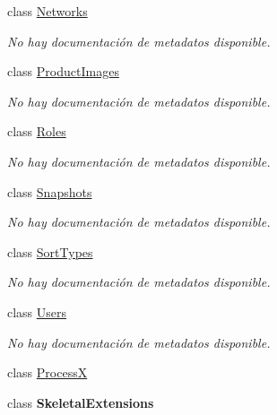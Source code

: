 \begin{DoxyCompactItemize}
class \hyperlink{class_game_memory_1_1_networks}{Networks}
\begin{DoxyCompactList}\small\item\em No hay documentación de metadatos disponible. \end{DoxyCompactList}\item 
class \hyperlink{class_game_memory_1_1_product_images}{Product\-Images}
\begin{DoxyCompactList}\small\item\em No hay documentación de metadatos disponible. \end{DoxyCompactList}\item 
class \hyperlink{class_game_memory_1_1_roles}{Roles}
\begin{DoxyCompactList}\small\item\em No hay documentación de metadatos disponible. \end{DoxyCompactList}\item 
class \hyperlink{class_game_memory_1_1_snapshots}{Snapshots}
\begin{DoxyCompactList}\small\item\em No hay documentación de metadatos disponible. \end{DoxyCompactList}\item 
class \hyperlink{class_game_memory_1_1_sort_types}{Sort\-Types}
\begin{DoxyCompactList}\small\item\em No hay documentación de metadatos disponible. \end{DoxyCompactList}\item 
class \hyperlink{class_game_memory_1_1_users}{Users}
\begin{DoxyCompactList}\small\item\em No hay documentación de metadatos disponible. \end{DoxyCompactList}\item 
class \hyperlink{class_game_memory_1_1_process_x}{Process\-X}
\item 
class {\bfseries Skeletal\-Extensions}
\end{DoxyCompactItemize}
